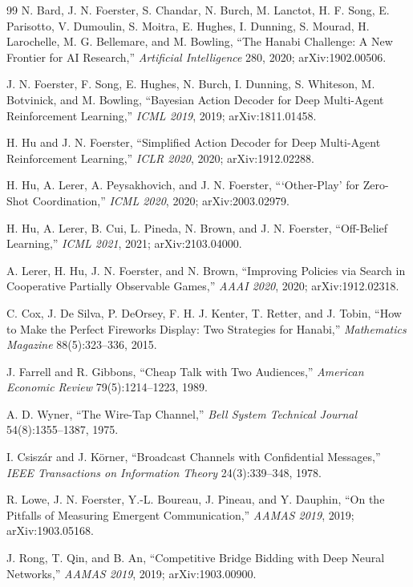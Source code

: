 \begin{thebibliography}{99}
N. Bard, J. N. Foerster, S. Chandar, N. Burch, M. Lanctot, H. F. Song,
E. Parisotto, V. Dumoulin, S. Moitra, E. Hughes, I. Dunning, S. Mourad,
H. Larochelle, M. G. Bellemare, and M. Bowling, ``The Hanabi Challenge: A New
Frontier for AI Research,'' \emph{Artificial Intelligence} 280, 2020;
arXiv:1902.00506.

J. N. Foerster, F. Song, E. Hughes, N. Burch, I. Dunning, S. Whiteson,
M. Botvinick, and M. Bowling, ``Bayesian Action Decoder for Deep Multi-Agent
Reinforcement Learning,'' \emph{ICML 2019}, 2019; arXiv:1811.01458.

H. Hu and J. N. Foerster, ``Simplified Action Decoder for Deep Multi-Agent
Reinforcement Learning,'' \emph{ICLR 2020}, 2020; arXiv:1912.02288.

H. Hu, A. Lerer, A. Peysakhovich, and J. N. Foerster, ```Other-Play' for
Zero-Shot Coordination,'' \emph{ICML 2020}, 2020; arXiv:2003.02979.

H. Hu, A. Lerer, B. Cui, L. Pineda, N. Brown, and J. N. Foerster, ``Off-Belief
Learning,'' \emph{ICML 2021}, 2021; arXiv:2103.04000.

A. Lerer, H. Hu, J. N. Foerster, and N. Brown, ``Improving Policies via Search
in Cooperative Partially Observable Games,'' \emph{AAAI 2020}, 2020;
arXiv:1912.02318.

C. Cox, J. De Silva, P. DeOrsey, F. H. J. Kenter, T. Retter, and J. Tobin, ``How
to Make the Perfect Fireworks Display: Two Strategies for Hanabi,''
\emph{Mathematics Magazine} 88(5):323--336, 2015.

J. Farrell and R. Gibbons, ``Cheap Talk with Two Audiences,'' \emph{American
Economic Review} 79(5):1214--1223, 1989.

A. D. Wyner, ``The Wire-Tap Channel,'' \emph{Bell System Technical Journal}
54(8):1355--1387, 1975.

I. Csisz\'ar and J. K\"orner, ``Broadcast Channels with Confidential Messages,''
\emph{IEEE Transactions on Information Theory} 24(3):339--348, 1978.

R. Lowe, J. N. Foerster, Y.-L. Boureau, J. Pineau, and Y. Dauphin, ``On the
Pitfalls of Measuring Emergent Communication,'' \emph{AAMAS 2019}, 2019;
arXiv:1903.05168.

J. Rong, T. Qin, and B. An, ``Competitive Bridge Bidding with Deep Neural
Networks,'' \emph{AAMAS 2019}, 2019; arXiv:1903.00900.


\end{thebibliography}
